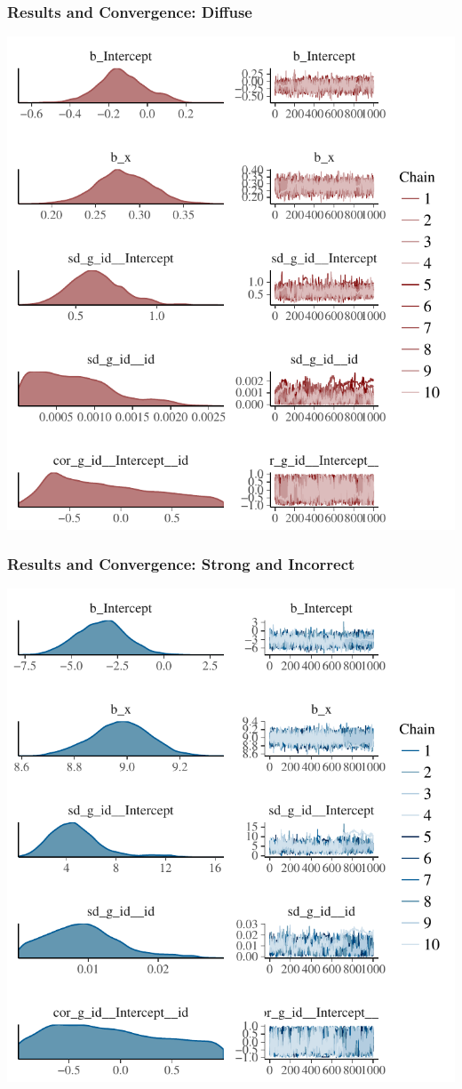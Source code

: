 \documentclass{beamer}
\begin{document}
\begin{frame}
\frametitle{Results and Convergence: Diffuse}
\includegraphics[scale=.5]{dif_fit.pdf}
\end{frame}

\begin{frame}
	\frametitle{Results and Convergence: Strong and Incorrect}
	\includegraphics[scale=.5]{str_inc_fit.pdf}
\end{frame}
\end{document}
